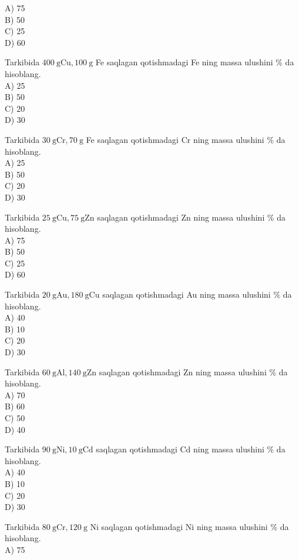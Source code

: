 A) 75\\
B) 50\\
C) 25\\
D) 60
  \item Tarkibida $400 \mathrm{~g} \mathrm{Cu}, 100 \mathrm{~g}$ Fe saqlagan qotishmadagi Fe ning massa ulushini \% da hisoblang.\\
A) 25\\
B) 50\\
C) 20\\
D) 30
  \item Tarkibida $30 \mathrm{~g} \mathrm{Cr}, 70 \mathrm{~g}$ Fe saqlagan qotishmadagi Cr ning massa ulushini \% da hisoblang.\\
A) 25\\
B) 50\\
C) 20\\
D) 30
  \item Tarkibida $25 \mathrm{~g} \mathrm{Cu}, 75 \mathrm{~g} \mathrm{Zn}$ saqlagan qotishmadagi Zn ning massa ulushini \% da hisoblang.\\
A) 75\\
B) 50\\
C) 25\\
D) 60
  \item Tarkibida $20 \mathrm{~g} \mathrm{Au}, 180 \mathrm{~g} \mathrm{Cu}$ saqlagan qotishmadagi Au ning massa ulushini \% da hisoblang.\\
A) 40\\
B) 10\\
C) 20\\
D) 30
  \item Tarkibida $60 \mathrm{~g} \mathrm{Al}, 140 \mathrm{~g} \mathrm{Zn}$ saqlagan qotishmadagi Zn ning massa ulushini \% da hisoblang.\\
A) 70\\
B) 60\\
C) 50\\
D) 40
  \item Tarkibida $90 \mathrm{~g} \mathrm{Ni}, 10 \mathrm{~g} \mathrm{Cd}$ saqlagan qotishmadagi Cd ning massa ulushini \% da hisoblang.\\
A) 40\\
B) 10\\
C) 20\\
D) 30
  \item Tarkibida $80 \mathrm{~g} \mathrm{Cr}, 120 \mathrm{~g}$ Ni saqlagan qotishmadagi Ni ning massa ulushini \% da hisoblang.\\
A) 75\\
